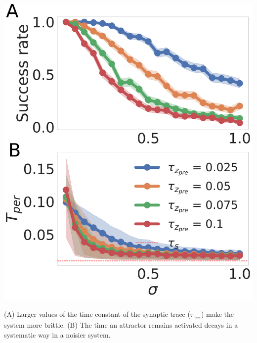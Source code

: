 \documentclass[portrait,a4, final]{baposter}
\begin{document}
\begin{poster}
{\begin{center}
\includegraphics[scale=0.15]{noise_effects.pdf}

\smaller (A) Larger values of the time constant of the synaptic trace ($\tau_{z_{pre}}$) make the system more brittle. (B) The time an attractor remains activated decays in a systematic way in a noisier system. 
\end{center}
 
	
}

\end{poster}
\end{document}
